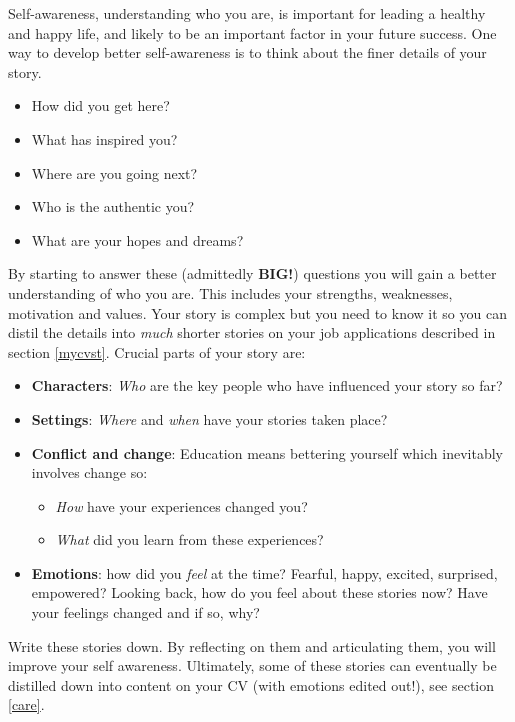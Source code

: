 \documentclass[
]{book}
\providecommand{\tightlist}{%
  \setlength{\itemsep}{0pt}\setlength{\parskip}{0pt}}
\begin{document}
Self-awareness, understanding who you are, is important for leading a healthy and happy life, and likely to be an important factor in your future success. One way to develop better self-awareness is to think about the finer details of your story. \citep{freeyourstory}

\begin{itemize}
\tightlist
\item
  How did you get here?
\item
  What has inspired you?
\item
  Where are you going next?
\item
  Who is the authentic you? \citep{regrets}
\item
  What are your hopes and dreams?
\end{itemize}

By starting to answer these (admittedly \textbf{BIG!}) questions you will gain a better understanding of who you are. This includes your strengths, weaknesses, motivation and values. \citep{parachute2020} Your story is complex but you need to know it so you can distil the details into \emph{much} shorter stories on your job applications described in section \ref{mycvst}. Crucial parts of your story are:

\begin{itemize}
\tightlist
\item
  \textbf{Characters}: \emph{Who} are the key people who have influenced your story so far?
\item
  \textbf{Settings}: \emph{Where} and \emph{when} have your stories taken place?
\item
  \textbf{Conflict and change}: Education means bettering yourself which inevitably involves change so:

  \begin{itemize}
  \tightlist
  \item
    \emph{How} have your experiences changed you?
  \item
    \emph{What} did you learn from these experiences?
  \end{itemize}
\item
  \textbf{Emotions}: how did you \emph{feel} at the time? Fearful, happy, excited, surprised, empowered? Looking back, how do you feel about these stories now? Have your feelings changed and if so, why?
\end{itemize}

Write these stories down. By reflecting on them and articulating them, you will improve your self awareness. Ultimately, some of these stories can eventually be distilled down into content on your CV (with emotions edited out!), see section \ref{care}.
\end{document}
